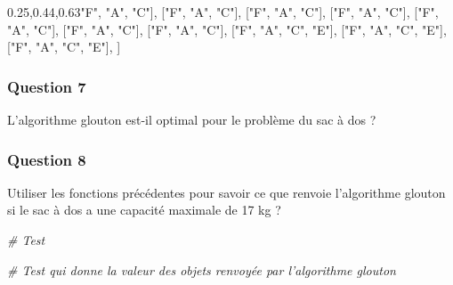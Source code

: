 \documentclass[
  paper=a4,
  ,captions=tableheading
]{scrartcl}
\newenvironment{Shaded}{}{}
\newcommand{\CommentTok}[1]{\textcolor[rgb]{0.38,0.63,0.69}{\textit{#1}}}
\newcommand{\NormalTok}[1]{#1}
\newcommand{\StringTok}[1]{\textcolor[rgb]{0.25,0.44,0.63}{#1}}
\begin{document}
\begin{Shaded}
\begin{Highlighting}[]
\NormalTok{    [}\StringTok{"F"}\NormalTok{, }\StringTok{"A"}\NormalTok{, }\StringTok{"C"}\NormalTok{],}
\NormalTok{    [}\StringTok{"F"}\NormalTok{, }\StringTok{"A"}\NormalTok{, }\StringTok{"C"}\NormalTok{],}
\NormalTok{    [}\StringTok{"F"}\NormalTok{, }\StringTok{"A"}\NormalTok{, }\StringTok{"C"}\NormalTok{],}
\NormalTok{    [}\StringTok{"F"}\NormalTok{, }\StringTok{"A"}\NormalTok{, }\StringTok{"C"}\NormalTok{],}
\NormalTok{    [}\StringTok{"F"}\NormalTok{, }\StringTok{"A"}\NormalTok{, }\StringTok{"C"}\NormalTok{],}
\NormalTok{    [}\StringTok{"F"}\NormalTok{, }\StringTok{"A"}\NormalTok{, }\StringTok{"C"}\NormalTok{],}
\NormalTok{    [}\StringTok{"F"}\NormalTok{, }\StringTok{"A"}\NormalTok{, }\StringTok{"C"}\NormalTok{],}
\NormalTok{    [}\StringTok{"F"}\NormalTok{, }\StringTok{"A"}\NormalTok{, }\StringTok{"C"}\NormalTok{, }\StringTok{"E"}\NormalTok{],}
\NormalTok{    [}\StringTok{"F"}\NormalTok{, }\StringTok{"A"}\NormalTok{, }\StringTok{"C"}\NormalTok{, }\StringTok{"E"}\NormalTok{],}
\NormalTok{    [}\StringTok{"F"}\NormalTok{, }\StringTok{"A"}\NormalTok{, }\StringTok{"C"}\NormalTok{, }\StringTok{"E"}\NormalTok{],}
\NormalTok{]}
\end{Highlighting}
\end{Shaded}

\hypertarget{question-7}{%
\subsubsection{Question 7}\label{question-7}}

L'algorithme glouton est-il optimal pour le problème du sac à dos ?

\hypertarget{question-8}{%
\subsubsection{Question 8}\label{question-8}}

Utiliser les fonctions précédentes pour savoir ce que renvoie
l'algorithme glouton si le sac à dos a une capacité maximale de 17 kg ?

\begin{Shaded}
\begin{Highlighting}[]
\CommentTok{\# Test}
\end{Highlighting}
\end{Shaded}

\begin{Shaded}
\begin{Highlighting}[]
\CommentTok{\# Test qui donne la valeur des objets renvoyée par l’algorithme glouton}
\end{Highlighting}
\end{Shaded}
\end{document}
